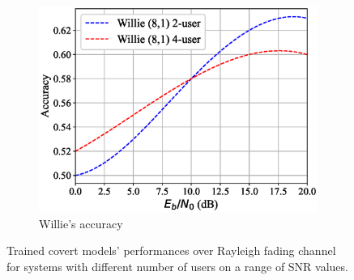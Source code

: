 \begin{figure}
\begin{subfigure}{0.3\textwidth}
		\includegraphics[width=\linewidth]{figs/multi_willie_accuracy_rayleigh}
		\caption{Willie's accuracy}
		\label{fig:multi_rayleigh_resutls_willie}
	\end{subfigure}
	\caption{Trained covert models' performances over Rayleigh fading channel for systems with different number of users on a range of SNR values.}
	\label{fig:multi_rayleigh_resutls}
\end{figure}

